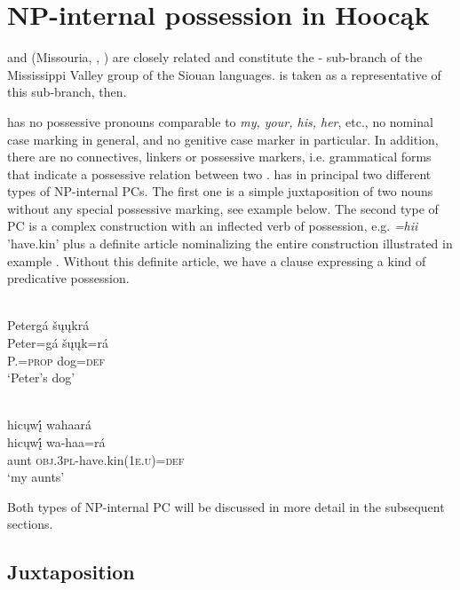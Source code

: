 \documentclass[output=paper]{LSP/langsci}
\begin{document}
\section{NP-internal possession in Hoocąk}

 and  (Missouria, , ) are closely related and constitute the - sub-branch of the Mississippi Valley group of the Siouan languages.  is taken as a representative of this sub-branch, then. 

 has no possessive pronouns comparable to  \textit{my, your, his, her}, etc., no nominal case marking in general, and no genitive case marker in particular. In addition, there are no connectives, linkers or possessive markers, i.e. grammatical forms that indicate a possessive relation between two .  has in principal two different types of NP-internal PCs. The first one is a simple juxtaposition of two nouns without any special possessive marking, see example  below. The second type of PC is a complex construction with an inflected verb of possession, e.g. \textit{=hii} 'have.kin' plus a definite article nominalizing the entire construction illustrated in example . Without this definite article, we have a clause expressing a kind of predicative possession. 

\ea  \label{petersdog}
 {}{\citealt[16]{Helmbrecht2003}} \\
\ea
\glll Petergá šųųkrá\\
Peter=gá     šųųk=rá \\
P.=\textsc{prop}    dog=\textsc{def} \\
\glt `Peter's dog'

\ex	 \label{myaunts}
 {}{\citealt[19]{Helmbrecht2003}} \\
\glll hicųwį́ wahaará\\
hicųwį́  wa-haa=rá \\
aunt     \textsc{obj.3pl}-have.kin(\textsc{1e.u})=\textsc{def} \\
\glt `my aunts'
\z
\z

Both types of NP-internal PC will be discussed in more detail in the subsequent sections.

\subsection{Juxtaposition}\label{sec:helmbrecht:3.1}
\end{document}
